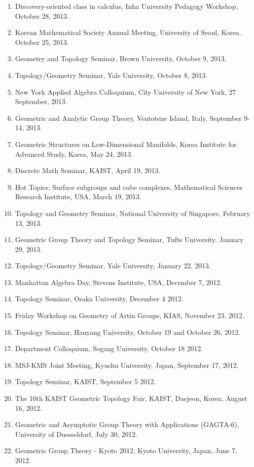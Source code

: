 \documentclass[11pt,a4paper]{article}
\begin{document}
\begin{enumerate}[leftmargin=1.5em, label=\arabic*.]
\item Discovery-oriented class in calculus, Inha University Pedagogy Workshop, October 28, 2013.
\item Korean Mathematical Society Annual Meeting, University of Seoul, Korea, October 25, 2013.
\item Geometry and Topology Seminar, Brown University, October 9, 2013.
\item Topology/Geometry Seminar, Yale University, October 8, 2013.
\item New York Applied Algebra Colloquium, City University of New York, 27 September, 2013.
\item Geometric and Analytic Group Theory, Ventotene Island, Italy, September 9-14, 2013.
\item Geometric Structures on Low-Dimensional Manifolds, Korea Institute for Advanced Study, Korea, May 24, 2013.
\item Discrete Math Seminar, KAIST, April 19, 2013.
\item Hot Topics: Surface subgroups and cube complexes, Mathematical Sciences Research Institute, USA, March 19, 2013.
\item Topology and Geometry Seminar, National University of Singapore, February 13, 2013.
\item Geometric Group Theory and Topology Seminar, Tufts University, January 29, 2013.
\item Topology/Geometry Seminar, Yale University, January 22, 2013.
\item Manhattan Algebra Day, Stevens Institute, USA, December 7, 2012.
\item Topology Seminar, Osaka University, December 4 2012.
\item Friday Workshop on Geometry of Artin Groups, KIAS, November 23, 2012.
\item Topology Seminar, Hanyang University, October 19 and October 26, 2012.
\item Department Colloquium, Sogang University, October 18 2012.
\item MSJ-KMS Joint Meeting, Kyushu University, Japan, September 17, 2012.
\item Topology Seminar, KAIST, September 5 2012.
\item The 10th KAIST Geometric Topology Fair, KAIST, Daejeon, Korea, August 16, 2012.
\item Geometric and Asymptotic Group Theory with Applications (GAGTA-6), University of Duesseldorf, July 30, 2012.
\item Geometric Group Theory - Kyoto 2012, Kyoto University, Japan, June 7, 2012.

\end{enumerate}
\end{document}
